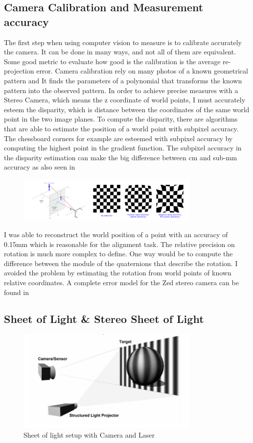 \documentclass[12pt,a4paper]{article}
\begin{document}
\subsection{Camera Calibration and Measurement accuracy}
The first step when using computer vision to measure is to calibrate accurately the camera. It can be done in many ways, and not all of them are equivalent. Some good metric to evaluate how good is the calibration is the average re-projection error. Camera calibration rely on many photos of a known geometrical pattern and It finds the parameters of a polynomial that transforms the known pattern into the observed pattern.
In order to achieve precise measures with a Stereo Camera, which means the z coordinate of world points, I must accurately esteem the disparity, which is distance between the coordinates of the same world point in the two image planes.
To compute the disparity, there are algorithms that are able to estimate the position of a world point with subpixel accuracy. The chessboard corners for example are esteemed with subpixel accuracy by computing the highest point in the gradient function. The subpixel accuracy in the disparity estimation can make the big difference between cm and sub-mm accuracy as also seen in \cite{sub_pixel_laser_spot}
\begin{figure}[h!]
\centering
\includegraphics[width=0.8\textwidth]{11.png}
\end{figure}
I was able to reconstruct the world position of a point with an accuracy of 0.15mm which is reasonable for the alignment task. The relative precision on rotation is much more complex to define. One way would be to compute the difference between the module of the quaternions that describe the rotation. I avoided the problem by estimating the rotation from world points of known relative coordinates. A complete error model for the Zed stereo camera can be found in \cite{Zed_data_error}

\subsection{Sheet of Light \& Stereo Sheet of Light}
\begin{figure}[h!]
\centering
\includegraphics[width=0.8\textwidth]{13.png}
\caption{Sheet of light setup with Camera and Laser}
\end{figure}
\end{document}
